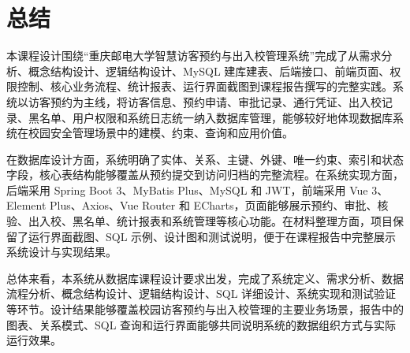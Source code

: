 \section{总结}
本课程设计围绕“重庆邮电大学智慧访客预约与出入校管理系统”完成了从需求分析、概念结构设计、逻辑结构设计、MySQL 建库建表、后端接口、前端页面、权限控制、核心业务流程、统计报表、运行界面截图到课程报告撰写的完整实践。系统以访客预约为主线，将访客信息、预约申请、审批记录、通行凭证、出入校记录、黑名单、用户权限和系统日志统一纳入数据库管理，能够较好地体现数据库系统在校园安全管理场景中的建模、约束、查询和应用价值。

在数据库设计方面，系统明确了实体、关系、主键、外键、唯一约束、索引和状态字段，核心表结构能够覆盖从预约提交到访问归档的完整流程。在系统实现方面，后端采用 Spring Boot 3、MyBatis Plus、MySQL 和 JWT，前端采用 Vue 3、Element Plus、Axios、Vue Router 和 ECharts，页面能够展示预约、审批、核验、出入校、黑名单、统计报表和系统管理等核心功能。在材料整理方面，项目保留了运行界面截图、SQL 示例、设计图和测试说明，便于在课程报告中完整展示系统设计与实现结果。

总体来看，本系统从数据库课程设计要求出发，完成了系统定义、需求分析、数据流程分析、概念结构设计、逻辑结构设计、SQL 详细设计、系统实现和测试验证等环节。设计结果能够覆盖校园访客预约与出入校管理的主要业务场景，报告中的图表、关系模式、SQL 查询和运行界面能够共同说明系统的数据组织方式与实际运行效果。
